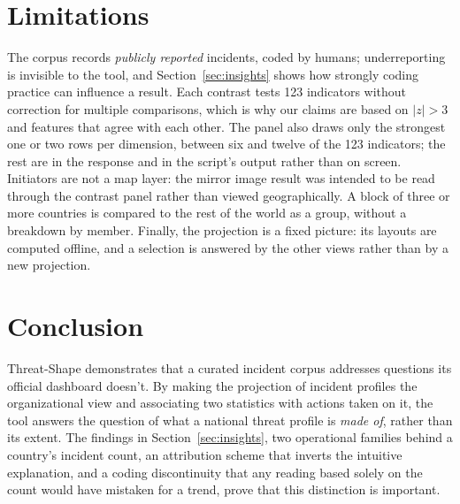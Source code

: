 \documentclass[conference]{IEEEtran}
\begin{document}
\section{Limitations}

The corpus records \emph{publicly reported} incidents, coded by humans; underreporting is invisible to the tool, and Section~\ref{sec:insights} shows how strongly coding practice can influence a result. Each contrast tests 123 indicators without correction for multiple comparisons, which is why our claims are based on $|z|>3$ and features that agree with each other. The panel also draws only the strongest one or two rows per dimension, between six and
twelve of the 123 indicators; the rest are in the response and in the script's output
rather than on screen. Initiators are not a map layer: the mirror image result was intended to be read through the contrast panel rather than viewed geographically. A block of three or more countries is compared to the rest of the world as a group, without a breakdown by member. Finally, the projection is a fixed picture: its layouts are computed offline, and a selection is answered by the other views rather than by a new projection.

\section{Conclusion}

Threat-Shape demonstrates that a curated incident corpus addresses questions its official dashboard doesn't. By making the projection of incident profiles the organizational view and associating two statistics with actions taken on it, the tool answers the question of what a national threat profile is \emph{made of}, rather than its extent. The findings in Section~\ref{sec:insights}, two operational families behind a country's incident count, an attribution scheme that inverts the intuitive explanation, and a coding discontinuity that any reading based solely on the count would have mistaken for a trend, prove that this distinction is important.
\end{document}
